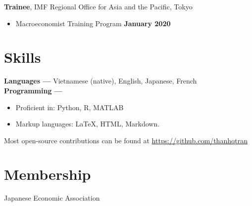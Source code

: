 \documentclass[margin,line]{res}
\begin{document}
\begin{resume}
{\bf Trainee}, IMF Regional Office for Asia and the Pacific, Tokyo
\vspace*{.05in}
\begin{itemize}
\item[ ] Macroeconomist Training Program \hfill {\bf January 2020}
\end{itemize}


\section{\sc Skills}
{\bf Languages ---}
\vspace*{.05in}
Vietnamese (native), English, Japanese, French \\
{\bf Programming ---}
\vspace*{.05in}
\begin{itemize}
	\item Proficient in: Python, R, MATLAB
	\item Markup languages: \LaTeX, HTML, Markdown.
\end{itemize}
Most open-source contributions can be found at \url{https://github.com/thanhqtran}

\section{\sc Membership}
Japanese Economic Association

\newpage

\ifx\nopubs\undefined

\else
%
\fi

%



\end{resume}
\end{document}

